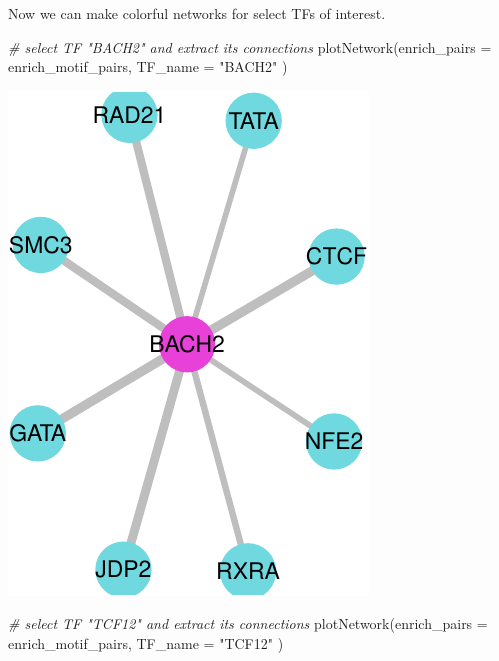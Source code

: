 \documentclass[
]{article}
\newenvironment{Shaded}{}{}
\newcommand{\AttributeTok}[1]{\textcolor[rgb]{0.49,0.56,0.16}{#1}}
\newcommand{\CommentTok}[1]{\textcolor[rgb]{0.38,0.63,0.69}{\textit{#1}}}
\newcommand{\FunctionTok}[1]{\textcolor[rgb]{0.02,0.16,0.49}{#1}}
\newcommand{\NormalTok}[1]{#1}
\newcommand{\StringTok}[1]{\textcolor[rgb]{0.25,0.44,0.63}{#1}}
\begin{document}
Now we can make colorful networks for select TFs of interest.

\begin{Shaded}
\begin{Highlighting}[]
  
\CommentTok{\# select TF "BACH2" and extract its connections}
\FunctionTok{plotNetwork}\NormalTok{(}\AttributeTok{enrich\_pairs =}\NormalTok{ enrich\_motif\_pairs, }
            \AttributeTok{TF\_name =} \StringTok{"BACH2"}
\NormalTok{            )}
\end{Highlighting}
\end{Shaded}

\includegraphics{enrichmotifpairR_user_manual_guide_files/figure-latex/Th17_treated_vs_untreated_6-1.pdf}

\begin{Shaded}
\begin{Highlighting}[]

\CommentTok{\# select TF "TCF12" and extract its connections}
\FunctionTok{plotNetwork}\NormalTok{(}\AttributeTok{enrich\_pairs =}\NormalTok{ enrich\_motif\_pairs, }
            \AttributeTok{TF\_name =} \StringTok{"TCF12"}
\NormalTok{            )}
\end{Highlighting}
\end{Shaded}
\end{document}
